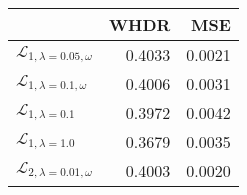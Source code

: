 \begin{tabular}{lrr}
\toprule
{} &    WHDR &     MSE \\
\midrule
$\mathcal L_{1,\lambda=0.05,\omega}$ &  0.4033 &  0.0021 \\
$\mathcal L_{1,\lambda=0.1,\omega}$  &  0.4006 &  0.0031 \\
$\mathcal L_{1,\lambda=0.1}$         &  0.3972 &  0.0042 \\
$\mathcal L_{1,\lambda=1.0}$         &  0.3679 &  0.0035 \\
$\mathcal L_{2,\lambda=0.01,\omega}$ &  0.4003 &  0.0020 \\
\bottomrule
\end{tabular}


